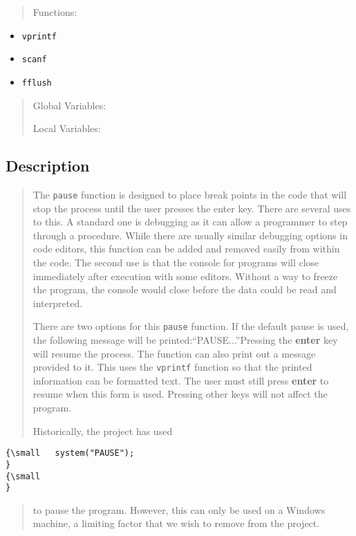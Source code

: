 \begin{quotation}
Functions:
\end{quotation}

\begin{itemize}
\item \texttt{vprintf}

\item \texttt{scanf}

\item \texttt{fflush}
\end{itemize}

\begin{quotation}
Global Variables:

Local Variables:
\end{quotation}

\subsection*{Description}

\begin{quotation}
The \texttt{pause} function is designed to place break points in the code
that will stop the process until the user presses the enter key. There are
several uses to this. A standard one is debugging as it can allow a
programmer to step through a procedure. While there are usually similar
debugging options in code editors, this function can be added and removed
easily from within the code. The second use is that the console for programs
will close immediately after execution with some editors. Without a way to
freeze the program, the console would close before the data could be read
and interpreted.

There are two options for this \texttt{pause} function. If the default pause
is used, the following message will be printed:``PAUSE...''Pressing the 
\textbf{enter} key will resume the process. The function can also print out
a message provided to it. This uses the \texttt{vprintf} function so that
the printed information can be formatted text. The user must still press 
\textbf{enter} to resume when this form is used. Pressing other keys will
not affect the program.

Historically, the project has used {\small }
\end{quotation}

\begin{verbatim}
{\small   system("PAUSE");
}
{\small   
}
\end{verbatim}

\begin{quotation}
to pause the program. However, this can only be used on a Windows machine, a
limiting factor that we wish to remove from the project.
\end{quotation}

